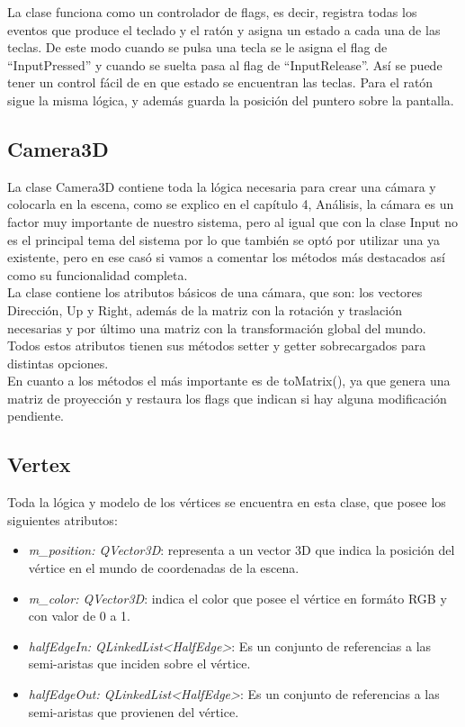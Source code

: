 La clase funciona como un controlador de flags, es decir, registra todas los eventos que produce el teclado y el ratón y asigna un estado a cada una de las teclas. De este modo cuando se pulsa una tecla se le asigna el flag de ``InputPressed'' y cuando se suelta pasa al flag de ``InputRelease''. Así se puede tener un control fácil de en que estado se encuentran las teclas. Para el ratón sigue la misma lógica, y además guarda la posición del puntero sobre la pantalla.

\subsection{ Camera3D}
La clase Camera3D contiene toda la lógica necesaria para crear una cámara y colocarla en la escena, como se explico en el capítulo 4, Análisis, la cámara es un factor muy importante de nuestro sistema, pero al igual que con la clase Input no es el principal tema del sistema por lo que también se optó por utilizar una ya existente, pero en ese casó si vamos a comentar los métodos más destacados así como su funcionalidad completa.\\

La clase contiene los atributos básicos de una cámara, que son: los vectores Dirección, Up y Right, además de la matriz con la rotación y traslación necesarias y por último una matriz con la transformación global del mundo. Todos estos atributos tienen sus métodos setter y getter sobrecargados para distintas opciones.\\

En cuanto a los métodos el más importante es de toMatrix(), ya que genera una matriz de proyección y restaura los flags que indican si hay alguna modificación pendiente.

\subsection{ Vertex}
Toda la lógica y modelo de los vértices se encuentra en esta clase, que posee los siguientes atributos:

\begin{itemize}
	\item \textit{m\_position: QVector3D}: representa a un vector 3D que indica la posición del vértice en el mundo de coordenadas de la escena.
	\item \textit{m\_color: QVector3D}: indica el color que posee el vértice en formáto RGB y con valor de 0 a 1. 
	
	\item \textit{halfEdgeIn: QLinkedList<HalfEdge>}: Es un conjunto de referencias a las semi-aristas que inciden sobre el vértice.
	\item \textit{halfEdgeOut: QLinkedList<HalfEdge>}: Es un conjunto de referencias a las semi-aristas que provienen del vértice.
\end{itemize}

